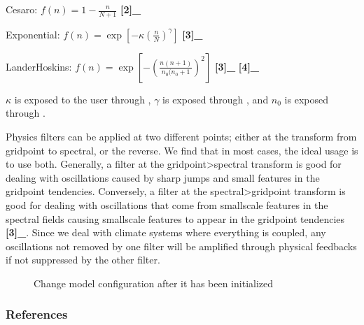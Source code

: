 \documentclass[letterpaper,10pt,english]{sphinxmanual}
\begin{document}
\begin{fulllineitems}
\begin{fulllineitems}
Cesaro: \(f(n)=1-\frac{n}{N+1}\) {\color{red}\bfseries{}{[}2{]}\_}

Exponential: \(f(n)=\exp\left[-\kappa\left(\frac{n}{N}\right)^\gamma\right]\) {\color{red}\bfseries{}{[}3{]}\_}

Lander\sphinxhyphen{}Hoskins: \(f(n)=\exp\left[-\left(\frac{n(n+1)}{n_0(n_0+1}\right)^2\right]\) {\color{red}\bfseries{}{[}3{]}\_} {\color{red}\bfseries{}{[}4{]}\_}

\(\kappa\) is exposed to the user through ,
\(\gamma\) is exposed through , and \(n_0\) is
exposed through .

Physics filters can be applied at two different points; either at the transform from gridpoint
to spectral, or the reverse. We find that in most cases, the ideal usage is to use both.
Generally, a filter at the gridpoint\sphinxhyphen{}\textgreater{}spectral transform is good for dealing with oscillations
caused by sharp jumps and small features in the gridpoint tendencies. Conversely, a filter
at the spectral\sphinxhyphen{}\textgreater{}gridpoint transform is good for dealing with oscillations that come from
small\sphinxhyphen{}scale features in the spectral fields causing small\sphinxhyphen{}scale features to appear in the
gridpoint tendencies {\color{red}\bfseries{}{[}3{]}\_}. Since we deal with climate systems where everything is coupled,
any oscillations not removed by one filter will be amplified through physical feedbacks if not
suppressed by the other filter.



\begin{description}
\item[{}] \leavevmode
Change model configuration after it has been initialized

\end{description}


\subsubsection*{References}

\end{fulllineitems}


\end{fulllineitems}

\end{document}
